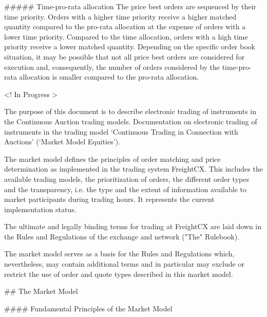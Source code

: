 \documentclass{article}
\begin{document}
##### Time-pro-rata allocation
The price best orders are sequenced by their time priority. Orders with a higher time priority receive a higher matched quantity compared to the pro-rata allocation at the expense of orders with a lower time priority. Compared to the time allocation, orders with a high time priority receive a lower matched quantity. Depending on the specific order book situation, it may be possible that not all price best orders are considered for execution and, consequently, the number of orders considered by the time-pro-rata allocation is smaller compared to the pro-rata allocation.


<! In Progress >

The purpose of this document is to describe electronic trading of instruments in the Continuous Auction
trading models. Documentation on electronic trading of instruments in the trading model ‘Continuous
Trading in Connection with Auctions’ (‘Market Model Equities’).


The market model defines the principles of order matching and price determination as implemented in the
trading system FreightCX. This includes the available trading models, the prioritization of orders, the different
order types and the transparency, i.e. the type and the extent of information available to market participants
during trading hours. It represents the current implementation status.

The ultimate and legally binding terms for trading at FreightCX are laid down in the
Rules and Regulations of the exchange and network ("The" Rulebook).

The market model serves as a basis for the Rules and Regulations which, nevertheless, may contain additional terms and in particular may exclude or restrict the use of order and quote types described in this market model.

## The Market Model

#### Fundamental Principles of the Market Model
\end{document}
